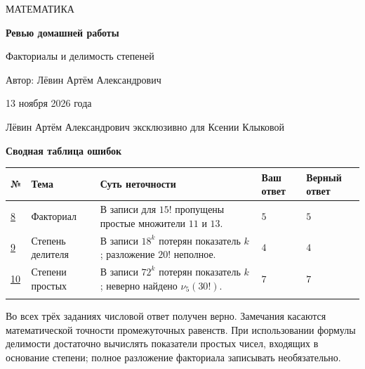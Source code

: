 \documentclass[a4paper,12pt]{article}
\begin{document}
\thispagestyle{empty}
\begin{center}
\vspace*{47mm}
{\Large\color{deep} МАТЕМАТИКА}\par\vspace{18mm}
{\Huge\bfseries Ревью домашней работы}\par\vspace{9mm}
{\Large Факториалы и делимость степеней}\par\vspace{26mm}
{\large Автор: Лёвин Артём Александрович}\par\vspace{6mm}
{\large 13 ноября 2026 года}
\end{center}
\vfill
\begin{center}
\textcolor{textgray}{\small Лёвин Артём Александрович эксклюзивно для Ксении Клыковой}\par\vspace{8mm}
\end{center}
\newpage
\begin{center}
{\Large\bfseries\color{deep} Сводная таблица ошибок}
\end{center}
\vspace{8mm}
\small
\renewcommand{\arraystretch}{1.28}
\begin{tabularx}{\linewidth}{@{}p{15mm}p{24mm}X p{18mm}p{19mm}@{}}
\toprule
\textbf{№} & \textbf{Тема} & \textbf{Суть неточности} & \textbf{Ваш ответ} & \textbf{Верный ответ}\\
\midrule
\hyperref[task:8]{8} & Факториал & В записи для $15!$ пропущены простые множители $11$ и $13$. & $5$ & $5$\\
\addlinespace[4pt]
\hyperref[task:9]{9} & Степень делителя & В записи $18^k$ потерян показатель $k$; разложение $20!$ неполное. & $4$ & $4$\\
\addlinespace[4pt]
\hyperref[task:10]{10} & Степени простых & В записи $72^k$ потерян показатель $k$; неверно найдено $\nu_5(30!)$. & $7$ & $7$\\
\addlinespace[4pt]
\bottomrule
\end{tabularx}
\par\normalsize
\vspace{13mm}
Во всех трёх заданиях числовой ответ получен верно. Замечания касаются математической точности промежуточных равенств. При использовании формулы делимости достаточно вычислять показатели простых чисел, входящих в основание степени; полное разложение факториала записывать необязательно.
\end{document}
